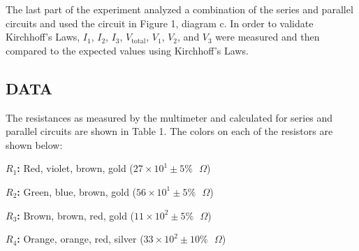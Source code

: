 \documentclass [12pt, letterpaper, twoside] {article}
\begin{document}
The last part of the experiment analyzed a combination of the series and parallel circuits and used the circuit in Figure 1, diagram c. In order to validate Kirchhoff's Laws, \(I_{1}\), \(I_{2}\), \(I_{3}\), \(V_{\text{total}}\), \(V_{1}\), \(V_{2}\), and \(V_{3}\) were measured and then compared to the expected values using Kirchhoff's Laws. 
    
\subsection* {DATA}
The resistances as measured by the multimeter and calculated for series and parallel circuits are shown in Table 1. The colors on each of the resistors are shown below: 

\vspace{0.5cm}
\indent
\textbf{\(R_{1}\):} Red, violet, brown, gold (\(27\times10^{1}\pm5\%\text{ }\Omega\))

\indent
\textbf{\(R_{2}\):} Green, blue, brown, gold (\(56\times10^{1}\pm5\%\text{ }\Omega\))

\indent
\textbf{\(R_{3}\):} Brown, brown, red, gold (\(11\times10^{2}\pm5\%\text{ }\Omega\))

\indent
\textbf{\(R_{4}\):} Orange, orange, red, silver (\(33\times10^{2}\pm10\%\text{ }\Omega\))
\vspace{0.5cm}
\end{document}

